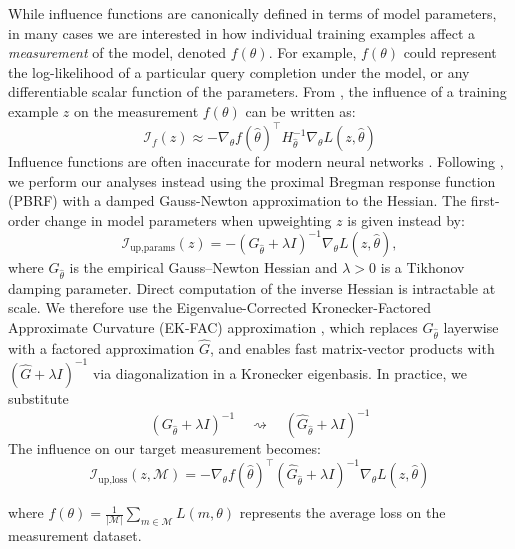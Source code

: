 \documentclass{article} %
\begin{document}
While influence functions are canonically defined in terms of model parameters, in many cases we are interested in how individual training examples affect a \textit{measurement} of the model, denoted $f(\theta)$. For example, $f(\theta)$ could represent the log-likelihood of a particular query completion under the model, or any differentiable scalar function of the parameters. From \citet{grosse2023studying}, the influence of a training example $z$ on the measurement $f(\theta)$ can be written as:
\begin{equation}
\mathcal{I}_{f}(z) \approx -\nabla_{\theta} f(\hat{\theta})^{\top} 
H_{\hat{\theta}}^{-1}
\nabla_{\theta} L(z, \hat{\theta})
\end{equation}
Influence functions are often inaccurate for modern neural networks \citep{bae2022if}. Following \citet{bae2022if, ruis2024procedural}, we perform our analyses instead using the proximal Bregman response function (PBRF) with a damped Gauss-Newton approximation to the Hessian. The first-order change in
model parameters when upweighting $z$ is given instead by:
\begin{equation}
  \mathcal{I}_{\text{up,params}}(z)
  = -(G_{\hat\theta} + \lambda I)^{-1}\nabla_\theta L(z,\hat\theta),
  \label{eq:pbrf}
\end{equation}
where $G_{\hat\theta}$ is the empirical Gauss--Newton Hessian and $\lambda > 0$ is a Tikhonov damping parameter. Direct computation of the inverse Hessian is intractable at scale. We therefore use
the Eigenvalue-Corrected Kronecker-Factored Approximate Curvature (EK-FAC)
approximation \citep{grosse2023studying}, which replaces
$G_{\hat\theta}$ layerwise with a factored approximation $\hat{G}$, and enables fast
matrix-vector products with $(\hat{G}+\lambda I)^{-1}$ via diagonalization in a
Kronecker eigenbasis. In practice, we substitute
\begin{equation}
(G_{\hat\theta} + \lambda I)^{-1}
\quad \rightsquigarrow \quad
(\hat{G}_{\hat\theta} + \lambda I)^{-1}
\end{equation}
The influence on our target measurement becomes:
\begin{equation}
\mathcal{I}_{\text{up,loss}}(z, \mathcal{M}) = -\nabla_\theta f(\hat{\theta})^\top(\hat G_{\hat\theta} + \lambda I)^{-1}\nabla_\theta L(z,\hat\theta)
\label{eq:iuploss}
\end{equation}

where $f(\theta) = \frac{1}{|\mathcal{M}|} \sum_{m \in \mathcal{M}} L(m, \theta)$ represents the average loss on the measurement dataset.
\end{document}
